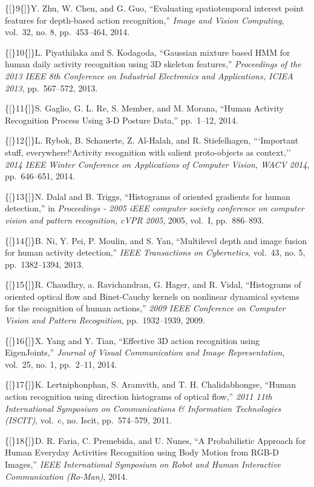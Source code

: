 \{{[}\}9\{{]}\}Y. Zhu, W. Chen, and G. Guo, ``Evaluating spatiotemporal
interest point features for depth-based action recognition,''
\emph{Image and
Vision Computing}, vol.~32, no. 8, pp.~453--464, 2014.

\{{[}\}10\{{]}\}L. Piyathilaka and S. Kodagoda, ``Gaussian mixture based
HMM for human daily activity recognition using 3D skeleton features,''
\emph{Proceedings of the 2013 IEEE 8th Conference on Industrial
Electronics and Applications, ICIEA 2013}, pp.~567--572, 2013.

\{{[}\}11\{{]}\}S. Gaglio, G. L. Re, S. Member, and M. Morana, ``Human
Activity Recognition Process Using 3-D Posture Data,'' pp.~1--12, 2014.

\{{[}\}12\{{]}\}L. Rybok, B. Schauerte, Z. Al-Halah, and R.
Stiefelhagen, ```Important stuff, everywhere!`Activity recognition with
salient proto-objects as context,'' \emph{2014 IEEE Winter Conference on
Applications of Computer Vision, WACV 2014}, pp.~646--651, 2014.

\{{[}\}13\{{]}\}N. Dalal and B. Triggs, ``Histograms of oriented
gradients for human detection,'' in
\emph{Proceedings - 2005 iEEE computer society
conference on computer vision and pattern recognition, cVPR 2005}, 2005,
vol.~I, pp.~886--893.

\{{[}\}14\{{]}\}B. Ni, Y. Pei, P. Moulin, and S. Yan, ``Multilevel depth
and image fusion for human activity detection,''
\emph{IEEE Transactions on
Cybernetics}, vol.~43, no. 5, pp.~1382--1394, 2013.

\{{[}\}15\{{]}\}R. Chaudhry, a. Ravichandran, G. Hager, and R. Vidal,
``Histograms of oriented optical flow and Binet-Cauchy kernels on
nonlinear dynamical systems for the recognition of human actions,''
\emph{2009 IEEE Conference on Computer Vision and Pattern Recognition},
pp.~1932--1939, 2009.

\{{[}\}16\{{]}\}X. Yang and Y. Tian, ``Effective 3D action recognition
using EigenJoints,'' \emph{Journal of Visual Communication and Image
Representation}, vol.~25, no. 1, pp.~2--11, 2014.

\{{[}\}17\{{]}\}K. Lertniphonphan, S. Aramvith, and T. H.
Chalidabhongse, ``Human action recognition using direction histograms of
optical flow,''
\emph{2011 11th International Symposium on Communications \& Information
Technologies (ISCIT)}, vol.~c, no. Iscit, pp.~574--579, 2011.

\{{[}\}18\{{]}\}D. R. Faria, C. Premebida, and U. Nunes, ``A
Probabilistic Approach for Human Everyday Activities Recognition using
Body Motion from RGB-D Images,''
\emph{IEEE International Symposium on Robot and
Human Interactive Communication (Ro-Man)}, 2014.

